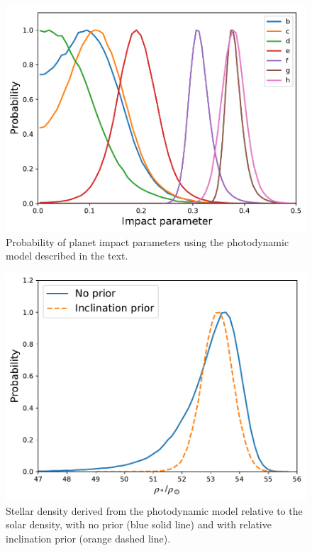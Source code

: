 \documentclass[twocolumn]{aastex63}
\begin{document}
\begin{figure}
    \centering
    \includegraphics[width=\hsize]{figures/impact_parameter_noprior.pdf}
    \caption{Probability of planet impact parameters using the photodynamic model described in the text.}
    \label{fig:impact_parameter}
\end{figure}

\begin{figure}
    \centering
    \includegraphics[width=\hsize]{figures/stellar_density_noprior.pdf}
    \caption{Stellar density derived from the photodynamic model relative to the solar density, with no prior (blue solid line) and with relative inclination prior (orange dashed line).}
    \label{fig:stellar_density}
\end{figure}
\end{document}
